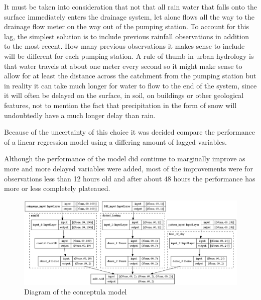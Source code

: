 It must be taken into consideration that not that all rain water that falls onto the surface immediately enters the drainage system, let alone flows all the way to the drainage flow meter on the way out of the pumping station. To account for this lag, the simplest solution is to include previous rainfall observations in addition to the most recent. 
How many previous observations it makes sense to include will be different for each pumping station. A rule of thumb in urban hydrology is that water travels at about one meter every second so it might make sense to allow for at least the distance across the catchment from the pumping station but in reality it can take much longer for water to flow to the end of the system, since it will often be delayed on the surface, in soil, on buildings or other geological features, not to mention the fact that precipitation in the form of snow will undoubtedly have a much longer delay than rain. 

Because of the uncertainty of this choice it was decided compare the performance of a linear regression model using a differing amount of lagged variables. %

Although the performance of the model did continue to marginally improve as more and more delayed variables were added, most of the improvements were for observations less than 12 hours old and after about 48 hours the performance has more or less completely plateaued. 


\begin{figure}
\centering\includegraphics[width=\textwidth]{Pictures/Plots/conceptual.png}
\caption{Diagram of the conceptula model}
\label{fig:ConceptualModelDiagram}
\end{figure}



